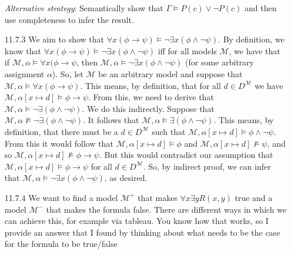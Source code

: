 \begin{itemize}
                \emph{Alternative strategy}: Semantically show that
                $\Gamma\vDash P(c)\lor\neg P(c)$ and then use
                completeness to infer the result.

                \item[11.7.3] We aim to show that $\forall
                  x(\phi\to\psi)\vDash\neg \exists x(\phi\land
                  \neg\psi)$. By definition, we know that $\forall
                  x(\phi\to\psi)\vDash\neg \exists x(\phi\land
                  \neg\psi)$ iff for all models $\mathcal{M}$, we have
                  that if $\mathcal{M},\alpha\vDash \forall
                  x(\phi\to\psi$, then $\mathcal{M},\alpha\vDash\neg
                  \exists x(\phi\land\neg\psi)$ (for some arbitrary
                  assignment $\alpha$). So, let $\mathcal{M}$ be an
                  arbitrary model and suppose that
                  $\mathcal{M},\alpha\vDash\forall x(\phi\to
                  \psi)$. This means, by definition, that for all
                  $d\in D^\mathcal{M}$ we have
                  $\mathcal{M},\alpha[x\mapsto d]\vDash
                  \phi\to\psi$. From this, we need to derive that
                  $\mathcal{M},\alpha\vDash\neg \exists
                  (\phi\land\neg\psi)$. We do this indirectly. Suppose
                  that $\mathcal{M},\alpha\nvDash\neg \exists
                  (\phi\land\neg\psi)$. It follows that  $\mathcal{M},\alpha\vDash \exists
                  (\phi\land\neg\psi)$. This means, by definition,
                  that there must be a $d\in D^\mathcal{M}$ such that
                  $\mathcal{M},\alpha[x\mapsto d]\vDash
                  \phi\land\neg\psi$. From this it would follow
                  that $\mathcal{M},\alpha[x\mapsto d]\vDash
                  \phi$ and $\mathcal{M},\alpha[x\mapsto
                  d]\nvDash\psi$, and so $\mathcal{M},\alpha[x\mapsto d]\nvDash
                  \phi\to\psi$. But this would contradict our
                  assumption that  $\mathcal{M},\alpha[x\mapsto d]\vDash
                  \phi\to\psi$ for all $d\in D^\mathcal{M}$. So, by
                  indirect proof, we can infer that  $\mathcal{M},\alpha\vDash\neg
                  \exists x(\phi\land\neg\psi)$, as desired.
                  
                  \item[11.7.4] We want to find a model
                    $\mathcal{M}^+$ that makes
                    $\forall x\exists yR(x,y)$ true and a model
                    $\mathcal{M}^-$ that makes the formula
                    false. There are different ways in which
                    we can achieve this, for example via tableau. You
                    know how that works, so I provide an answer that
                    I found by thinking about what needs to be the
                    case for the formula to be true/false


\end{itemize}
